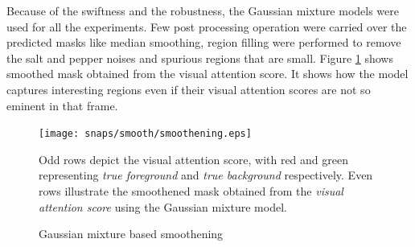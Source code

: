 \par Because of the swiftness and the robustness, the Gaussian mixture models were used for all the experiments.  Few post processing operation were carried over the predicted masks like median smoothing, region filling were performed to remove the salt and pepper noises and spurious regions that are small.  Figure \ref{fig:smoothen} shows smoothed mask obtained from the visual attention score.  It shows how the model captures interesting regions even if their visual attention scores are not so eminent in that frame.
\begin{figure}[!htpb]
   \begin{center}
	    \texttt{[image: snaps/smooth/smoothening.eps]}     
     \caption {Gaussian mixture based smoothening}
   \label{fig:smoothen}
   \medskip 
 	\small Odd rows depict the visual attention score, with red and green representing \textit{true foreground} and \textit{true background} respectively.  Even rows illustrate the smoothened mask obtained from the \textit{visual attention score} using the Gaussian mixture model. 
   \end{center}
 \end{figure}
 
